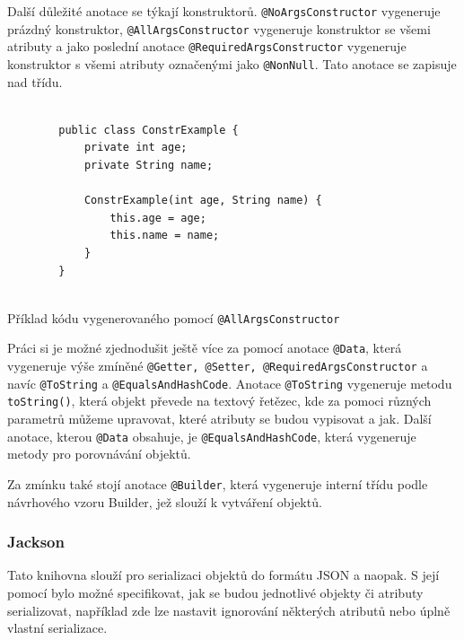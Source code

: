 Další důležité anotace se týkají konstruktorů. \texttt{@NoArgsConstructor} vygeneruje prázdný konstruktor, \texttt{@AllArgsConstructor} vygeneruje konstruktor se všemi atributy  a jako poslední anotace \texttt{@RequiredArgsConstructor} vygeneruje konstruktor s všemi atributy označenými jako \texttt{@NonNull}. Tato anotace se zapisuje nad třídu. \cite{lombok:constructor} 

\begin{listing}[H]
    \begin{verbatim}

        public class ConstrExample {
            private int age;
            private String name;

            ConstrExample(int age, String name) {
                this.age = age;
                this.name = name;
            }
        }
    
    \end{verbatim}
    \caption{Příklad kódu vygenerovaného pomocí \texttt{@AllArgsConstructor}}
    \label{code:lombok:constructor}
\end{listing}


Práci si je možné zjednodušit ještě více za pomocí anotace \texttt{@Data}, která vygeneruje výše zmíněné \texttt{@Getter, @Setter, @RequiredArgsConstructor} a navíc \texttt{@ToString} a \texttt{@EqualsAndHashCode}.\cite{lombok:data} Anotace \texttt{@ToString} vygeneruje metodu \texttt{toString()}, která objekt převede na textový řetězec, kde za pomoci různých parametrů můžeme upravovat, které atributy se budou vypisovat a jak. Další anotace, kterou \texttt{@Data} obsahuje, je \texttt{@EqualsAndHashCode}, která vygeneruje metody pro porovnávání objektů.

Za zmínku také stojí anotace \texttt{@Builder}, která vygeneruje interní třídu podle návrhového vzoru Builder\cite{refactoringGuru:builder}, jež slouží k vytváření objektů. \cite{lombok:builder}

\subsubsection*{Jackson}\label{sec:impl:jackson}
Tato knihovna slouží pro serializaci objektů do formátu JSON  a naopak. S její pomocí bylo možné specifikovat, jak se budou jednotlivé objekty či atributy serializovat, například zde lze nastavit ignorování některých atributů nebo úplně vlastní serializace.

